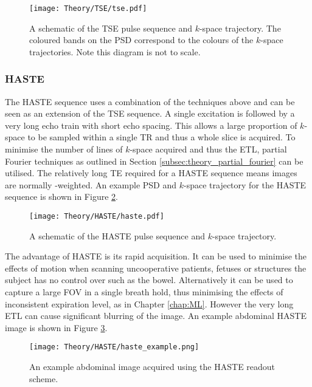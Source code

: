 \begin{figure}[H]
	\centering
	\texttt{[image: Theory/TSE/tse.pdf]}
	\caption{A schematic of the \ac{TSE} pulse sequence and $k$-space trajectory. The coloured bands on the \ac{PSD} correspond to the colours of the $k$-space trajectories. Note this diagram is not to scale.}
	\label{fig:theory_tse}	
\end{figure}

\subsubsection{\ac*{HASTE}}
The \ac{HASTE} sequence uses a combination of the techniques above and can be seen as an extension of the \ac{TSE} sequence. A single excitation is followed by a very long echo train with short echo spacing. This allows a large proportion of $k$-space to be sampled within a single \ac{TR} and thus a whole slice is acquired. To minimise the number of lines of $k$-space acquired and thus the \ac{ETL}, partial Fourier techniques as outlined in Section \ref{subsec:theory_partial_fourier} can be utilised. The relatively long \ac{TE} required for a \ac{HASTE} sequence means images are normally \ttwo-weighted. An example \ac{PSD} and $k$-space trajectory for the \ac{HASTE} sequence is shown in Figure \ref{fig:theory_haste_psd}.

\begin{figure}[H]
	\centering
	\texttt{[image: Theory/HASTE/haste.pdf]}
	\caption{A schematic of the \ac{HASTE} pulse sequence and $k$-space trajectory.}
	\label{fig:theory_haste_psd}	
\end{figure}

The advantage of \ac{HASTE} is its rapid acquisition. It can be used to minimise the effects of motion when scanning uncooperative patients, fetuses or structures the subject has no control over such as the bowel. Alternatively it can be used to capture a large \ac{FOV} in a single breath hold, thus minimising the effects of inconsistent expiration level, as in Chapter \ref{chap:ML}. However the very long \ac{ETL} can cause significant blurring of the image. An example abdominal \ac{HASTE} image is shown in Figure \ref{fig:theory_haste_example}.

\begin{figure}[H]
	\centering
	\texttt{[image: Theory/HASTE/haste\_example.png]}
	\caption{An example abdominal image acquired using the \ac{HASTE} readout scheme.}
	\label{fig:theory_haste_example}
\end{figure}

